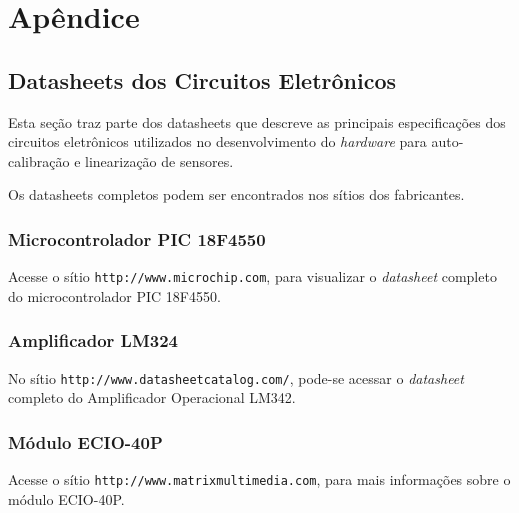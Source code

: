 \chapter{Apêndice}

\section{Datasheets dos Circuitos Eletrônicos}

Esta seção traz parte dos datasheets que descreve as principais especificações dos circuitos eletrônicos utilizados no desenvolvimento do \emph{hardware} para auto-calibração e linearização de sensores.

Os datasheets completos podem ser encontrados nos sítios dos fabricantes. 

\subsection{Microcontrolador PIC 18F4550}

Acesse o sítio \texttt{http://www.microchip.com}, para visualizar o \emph{datasheet} completo do microcontrolador PIC 18F4550.


%
%
\subsection{Amplificador LM324}

No sítio \texttt{http://www.datasheetcatalog.com/}, pode-se acessar o \emph{datasheet} completo do Amplificador Operacional LM342. 

%


\subsection{Módulo ECIO-40P}

Acesse o sítio \texttt{http://www.matrixmultimedia.com}, para mais informações sobre o módulo ECIO-40P.

